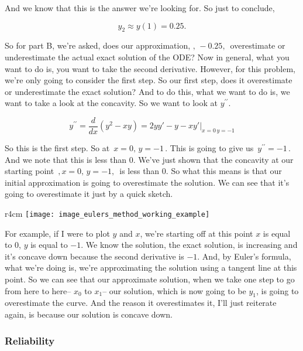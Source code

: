And we know that this is the answer we're looking for.
So just to conclude,

\begin{equation*}
  y_2 \approx y(1) = 0.25. 
\end{equation*}

So for part B, we're asked, does our approximation,
$, \, -0.25 , \,$  overestimate or underestimate the actual exact solution of the ODE?
Now in general, what you want to do is, you want to take the second derivative.
However, for this problem, we're only going to consider the first step.
So our first step, does it overestimate or underestimate the exact solution?
And to do this, what we want to do
is, we want to take a look at the concavity.
So we want to look at $y^{\prime \prime}$.

\begin{equation*}
  y^{\prime \prime} = \frac{d}{dx} \left( y^2 - xy \right) = 2yy' -y - xy' |_{x = 0\, y =-1}
\end{equation*}

So this is the first step.
So at $\, x = 0 ,\, y = -1 \,$. 
This is going to give us $\, y^{\prime \prime} = -1\,$. 
And we note that this is less than $0$.
We've just shown that the concavity
at our starting point $\, , x = 0,\,  y = -1,\,$ is less than $0$.
So what this means is that our initial approximation is going
to overestimate the solution.
We can see that it's going to overestimate it just
by a quick sketch.

\begin{wrapfigure}{r}{4cm}
  \texttt{[image: image\_eulers\_method\_working\_example]}
\end{wrapfigure}

For example, if I were to plot $y$ and $x$,
we're starting off at this point $x$ is equal to $0$,
$y$ is equal to $-1$.
We know the solution, the exact solution, is increasing
and it's concave down because the second derivative is $-1$. 
And, by Euler's formula, what we're doing is,
we're approximating the solution using a tangent line at this point.
So we can see that our approximate solution, when
we take one step to go from here to here--
$x_0$ to $x_1$--
our solution, which is now going to be $y_1$, is going to overestimate the curve.
And the reason it overestimates it, I'll just reiterate again,
is because our solution is concave down.

\clearpage

\subsubsection{Reliability}

